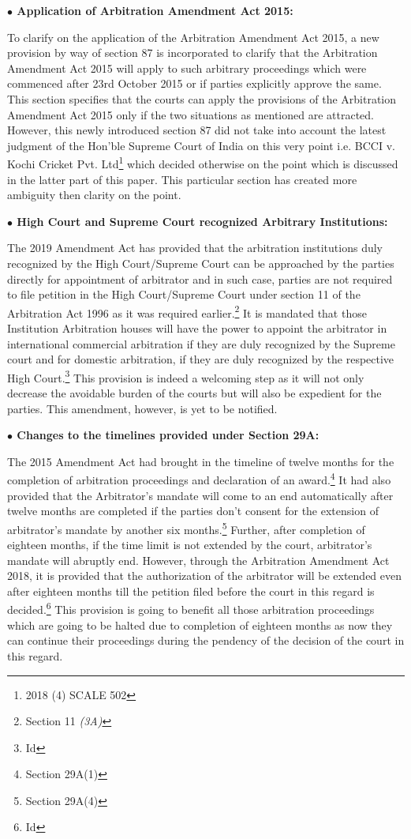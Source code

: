 \begin{multicols}{2}
\noi
{\large \bfseries $\bullet$ Application of Arbitration Amendment Act 2015:}

\noi
To clarify on the application of the Arbitration Amendment Act 2015, a new provision by
way of section 87 is incorporated to clarify that the Arbitration Amendment Act 2015 will
apply to such arbitrary proceedings which were commenced after 23rd October 2015 or if
parties explicitly approve the same. This section specifies that the courts can apply the
provisions of the Arbitration Amendment Act 2015 only if the two situations as mentioned 
are attracted. However, this newly introduced section 87 did not take into account the latest
judgment of the Hon’ble Supreme Court of India on this very point i.e. BCCI v. Kochi
Cricket Pvt. Ltd\footnote{2018 (4) SCALE 502} which decided otherwise on the point which is discussed in the latter part
of this paper. This particular section has created more ambiguity then clarity on the point.

\noi
{\large \bfseries $\bullet$ High Court and Supreme Court recognized Arbitrary Institutions:}

\noi
The 2019 Amendment Act has provided that the arbitration institutions duly recognized by
the High Court/Supreme Court can be approached by the parties directly for appointment of
arbitrator and in such case, parties are not required to file petition in the High Court/Supreme
Court under section 11 of the Arbitration Act 1996 as it was required earlier.\footnote{Section 11 \textit{(3A)}} It is mandated
that those Institution Arbitration houses will have the power to appoint the arbitrator in
international commercial arbitration if they are duly recognized by the Supreme court and for
domestic arbitration, if they are duly recognized by the respective High Court.\footnote{Id} This
provision is indeed a welcoming step as it will not only decrease the avoidable burden of the
courts but will also be expedient for the parties. This amendment, however, is yet to be
notified.

\noi
{\large \bfseries $\bullet$ Changes to the timelines provided under Section 29A:}

\noi
The 2015 Amendment Act had brought in the timeline of twelve months for the completion
of arbitration proceedings and declaration of an award.\footnote{Section 29A(1)} It had also provided that the
Arbitrator’s mandate will come to an end automatically after twelve months are completed if
the parties don’t consent for the extension of arbitrator’s mandate by another six months.\footnote{Section 29A(4)}
Further, after completion of eighteen months, if the time limit is not extended by the court,
arbitrator’s mandate will abruptly end. However, through the Arbitration Amendment Act
2018, it is provided that the authorization of the arbitrator will be extended even after
eighteen months till the petition filed before the court in this regard is decided.\footnote{Id} This
provision is going to benefit all those arbitration proceedings which are going to be halted 
due to completion of eighteen months as now they can continue their proceedings during the
pendency of the decision of the court in this regard.


\end{multicols}
